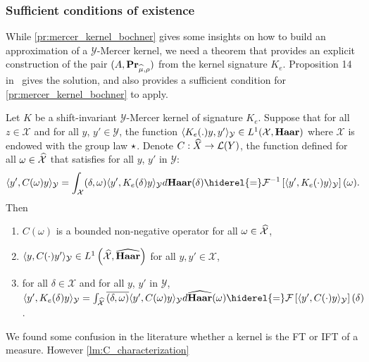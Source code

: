 \documentclass[twoside,11pt]{article}
\begin{document}
\subsubsection{Sufficient conditions of existence}
\label{subsec:sufficient_conditions}
While \cref{pr:mercer_kernel_bochner} gives some insights on how to build an
approximation of a $\mathcal{Y}$-Mercer kernel, we need a theorem that provides
an explicit construction of the pair $(A, {\mathbf{{Pr}}}_{\widehat{\mu},\rho})$ from
the kernel signature $K_e$. Proposition 14 in~\citet{Carmeli2010} gives the
solution, and also provides a sufficient condition for
\cref{pr:mercer_kernel_bochner} to apply.
\begin{proposition}
\label{pr:inverse_ovk_Fourier_decomposition}
    Let $K$ be a shift-invariant $\mathcal{Y}$-Mercer kernel of signature
    $K_e$.  Suppose that for all $z \in \mathcal{X}$ and for all $y$, $y'
    \in\mathcal{Y}$, the function $\langle K_e(.)y,y'\rangle_{\mathcal{Y}}\in
    L^1(\mathcal{X},\mathbf{Haar})$ where $\mathcal{X}$ is endowed with the group law
    $\star$. Denote $C: \widehat{X} \to \mathcal{L}(Y)$, the function defined
    for all $\omega \in \widehat{\mathcal{X}}$ that satisfies for all $y$, $y'$ in
    $\mathcal{Y}$:
    \begin{dmath}\label{eq:CK0}
        \inner{y',C(\omega)y}_{\mathcal{Y}}= \int_{\mathcal{X}}
        \pairing{\delta, \omega}\inner{y',
        K_e(\delta)y}_{\mathcal{Y}}d\Haar(\delta) \hiderel{=} \IFT{\inner{y',
        K_e(\cdot)y}_{\mathcal{Y}}}(\omega).
    \end{dmath}
    Then
    \begin{enumerate}
        \item $C(\omega)$ is a bounded non-negative operator for all $\omega
        \in \widehat{\mathcal{X}}$,
        \item $\langle y, C(\cdot)y'\rangle_{\mathcal{Y}}\in
        L^1\left(\widehat{\mathcal{X}},\widehat{\mathbf{Haar}}\right)$ for all
        $y,y'\in\mathcal{X}$,
        \item for all $\delta\in\mathcal{X}$ and for all $y$, $y'$ in
        $\mathcal{Y}$, $\inner{y', K_e(\delta)y}_{\mathcal{Y}}=
        \int_{\dual{\mathcal{X}}}\conj{\pairing{\delta,\omega}}\inner{y',
        C(\omega)y}_{\mathcal{Y}}d\dual{\Haar}(\omega) \hiderel{=}
        \FT{\inner{y', C(\cdot)y}_{\mathcal{Y}}}(\delta)$.
    \end{enumerate}
\end{proposition}
We found some confusion in the literature whether a kernel is the
\acl{FT} or \acl{IFT} of a measure. However \cref{lm:C_characterization}
\end{document}
